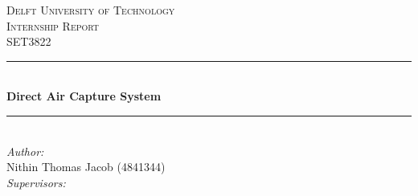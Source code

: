 \documentclass[12pt]{extarticle}
\begin{document}
\begin{titlepage}

\newcommand{\HRule}{\rule{\linewidth}{0.5mm}} 							%
\center 
 
\textsc{\LARGE Delft University of Technology}\\[1cm]

\textsc{\Large Internship Report}\\[0.2cm]
\textsc{\large SET3822}\\[1cm] 										%
\HRule \\[0.8cm]
{ \huge \bfseries Direct Air Capture System}\\[0.7cm]								%
\HRule \\[2cm]
\large
\emph{Author:}\\
Nithin Thomas Jacob (4841344)\\[1.0cm]

\emph{Supervisors:}\\
\begin{table}[H]
\centering
{}
\end{table}


\end{titlepage}
\end{document}
